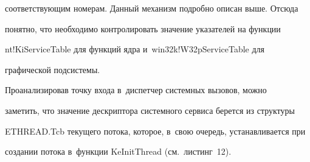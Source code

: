 соответствующим номерам. Данный механизм подробно описан выше. Отсюда 


понятно, что необходимо контролировать значение указателей на функции 


{\sf nt!KiServiceTable} для функций ядра и~{\sf win32k!W32pServiceTable} для 


графической подсистемы.


  


  Проанализировав точку входа в~диспетчер системных вызовов, можно 


заметить, что значение дескриптора системного сервиса берется из структуры 


{\sf ETHREAD.Tcb} текущего потока, которое, в~свою очередь, устанавливается при 


создании потока в~функции {\sf KeInitThread} (см.\ листинг~12).





